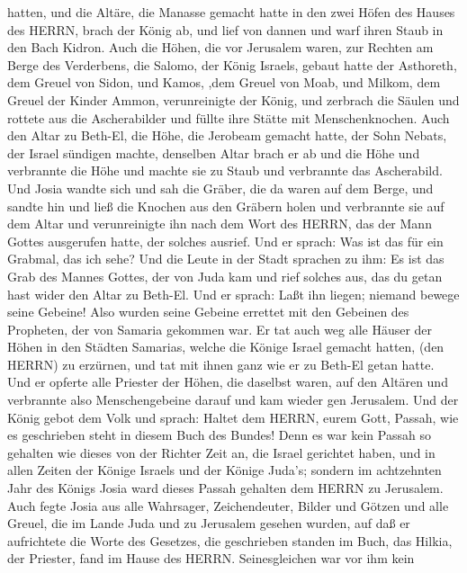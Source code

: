 hatten, und die Altäre, die Manasse gemacht hatte in den zwei Höfen des
Hauses des HERRN, brach der König ab, und lief von dannen und warf ihren
Staub in den Bach Kidron.  Auch die Höhen, die vor
Jerusalem waren, zur Rechten am Berge des Verderbens, die Salomo, der
König Israels, gebaut hatte der Asthoreth, dem Greuel von Sidon, und
Kamos, ,dem Greuel von Moab, und Milkom, dem Greuel der Kinder Ammon,
verunreinigte der König,  und zerbrach die Säulen und
rottete aus die Ascherabilder und füllte ihre Stätte mit
Menschenknochen.  Auch den Altar zu Beth-El, die Höhe, die
Jerobeam gemacht hatte, der Sohn Nebats, der Israel sündigen machte,
denselben Altar brach er ab und die Höhe und verbrannte die Höhe und
machte sie zu Staub und verbrannte das Ascherabild.  Und
Josia wandte sich und sah die Gräber, die da waren auf dem Berge, und
sandte hin und ließ die Knochen aus den Gräbern holen und verbrannte sie
auf dem Altar und verunreinigte ihn nach dem Wort des HERRN, das der
Mann Gottes ausgerufen hatte, der solches ausrief.  Und er
sprach: Was ist das für ein Grabmal, das ich sehe? Und die Leute in der
Stadt sprachen zu ihm: Es ist das Grab des Mannes Gottes, der von Juda
kam und rief solches aus, das du getan hast wider den Altar zu Beth-El.
 Und er sprach: Laßt ihn liegen; niemand bewege seine
Gebeine! Also wurden seine Gebeine errettet mit den Gebeinen des
Propheten, der von Samaria gekommen war.  Er tat auch weg
alle Häuser der Höhen in den Städten Samarias, welche die Könige Israel
gemacht hatten, (den HERRN) zu erzürnen, und tat mit ihnen ganz wie er
zu Beth-El getan hatte.  Und er opferte alle Priester der
Höhen, die daselbst waren, auf den Altären und verbrannte also
Menschengebeine darauf und kam wieder gen Jerusalem.  Und
der König gebot dem Volk und sprach: Haltet dem HERRN, eurem Gott,
Passah, wie es geschrieben steht in diesem Buch des Bundes!
 Denn es war kein Passah so gehalten wie dieses von der
Richter Zeit an, die Israel gerichtet haben, und in allen Zeiten der
Könige Israels und der Könige Juda's;  sondern im
achtzehnten Jahr des Königs Josia ward dieses Passah gehalten dem HERRN
zu Jerusalem.  Auch fegte Josia aus alle Wahrsager,
Zeichendeuter, Bilder und Götzen und alle Greuel, die im Lande Juda und
zu Jerusalem gesehen wurden, auf daß er aufrichtete die Worte des
Gesetzes, die geschrieben standen im Buch, das Hilkia, der Priester,
fand im Hause des HERRN.  Seinesgleichen war vor ihm kein
